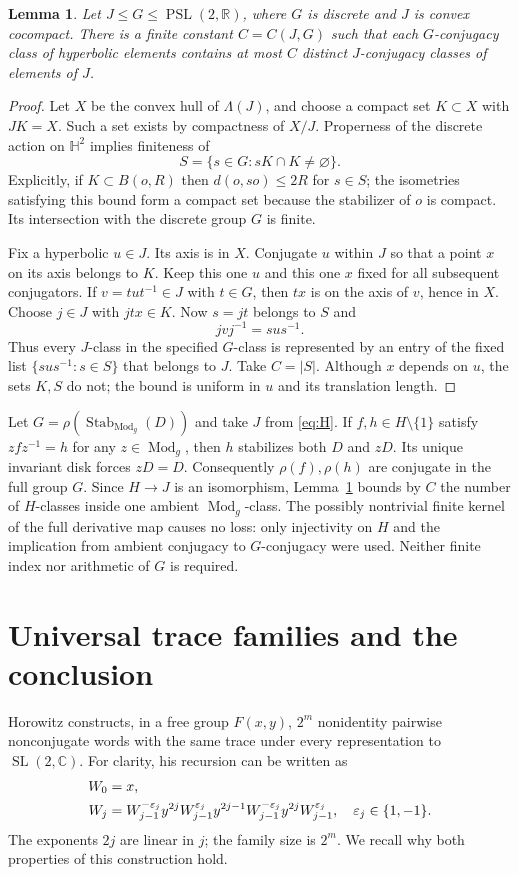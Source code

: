 \documentclass[11pt]{article}
\newtheorem{lemma}[theorem]{Lemma}
\theoremstyle{remark}\newtheorem*{remark}{Remark}
\newcommand{\Mod}{\operatorname{Mod}}
\newcommand{\PSL}{\operatorname{PSL}}
\newcommand{\SL}{\operatorname{SL}}
\newcommand{\HH}{\mathbb H^2}
\begin{document}
\begin{lemma}\label{lem:fusion}
Let $J\le G\le\PSL(2,\mathbb R)$, where $G$ is discrete and $J$ is
convex cocompact. There is a finite constant $C=C(J,G)$ such that each
$G$-conjugacy class of hyperbolic elements contains at most $C$ distinct
$J$-conjugacy classes of elements of $J$.
\end{lemma}
\begin{proof}
Let $X$ be the convex hull of $\Lambda(J)$, and choose a compact set
$K\subset X$ with $JK=X$. Such a set exists by compactness of $X/J$.
Properness of the discrete action on $\HH$ implies finiteness of
\[
 S=\{s\in G:sK\cap K\ne\varnothing\}.
\]
Explicitly, if $K\subset B(o,R)$ then $d(o,so)\le2R$ for $s\in S$;
the isometries satisfying this bound form a compact set because the
stabilizer of $o$ is compact. Its intersection with the discrete group
$G$ is finite.

Fix a hyperbolic $u\in J$. Its axis is in $X$. Conjugate $u$ within $J$
so that a point $x$ on its axis belongs to $K$. Keep this one $u$ and this
one $x$ fixed for all subsequent conjugators. If $v=tut^{-1}\in J$ with
$t\in G$, then $tx$ is on the axis of $v$, hence in $X$.
Choose $j\in J$ with $jtx\in K$. Now $s=jt$ belongs to $S$ and
\[
 jvj^{-1}=sus^{-1}.
\]
Thus every $J$-class in the specified $G$-class is represented by an
entry of the fixed list $\{sus^{-1}:s\in S\}$ that belongs to $J$.
Take $C=|S|$. Although $x$ depends on $u$, the sets $K,S$ do not;
the bound is uniform in $u$ and its translation length.
\end{proof}

Let $G=\rho(\operatorname{Stab}_{\Mod_g}(D))$ and take $J$ from
\eqref{eq:H}. If $f,h\in H\setminus\{1\}$ satisfy $zfz^{-1}=h$
for any $z\in\Mod_g$, then $h$ stabilizes both $D$ and $zD$.
Its unique invariant disk forces $zD=D$. Consequently
$\rho(f),\rho(h)$ are conjugate in the full group $G$.
Since $H\to J$ is an isomorphism, Lemma~\ref{lem:fusion} bounds by
$C$ the number of $H$-classes inside one ambient $\Mod_g$-class.
The possibly nontrivial finite kernel of the full derivative map causes
no loss: only injectivity on $H$ and the implication from ambient
conjugacy to $G$-conjugacy were used. Neither finite index nor arithmetic
of $G$ is required.

\section{Universal trace families and the conclusion}
Horowitz \cite[Example 8.2, pp.~648--649]{Horowitz} constructs, in a free
group $F(x,y)$, $2^m$ nonidentity pairwise nonconjugate words with the
same trace under every representation to $\SL(2,\mathbb C)$.
For clarity, his recursion can be written as
\begin{align}\label{eq:horowitz}
 W_0&=x,\notag\\
 W_j&=W_{j-1}^{-\varepsilon_j}y^{2j}
       W_{j-1}^{\varepsilon_j}y^{2j-1}
       W_{j-1}^{-\varepsilon_j}y^{2j}
       W_{j-1}^{\varepsilon_j},\quad \varepsilon_j\in\{1,-1\}.
\end{align}
The exponents $2j$ are linear in $j$; the family size is $2^m$.
We recall why both properties of this construction hold.
\end{document}
